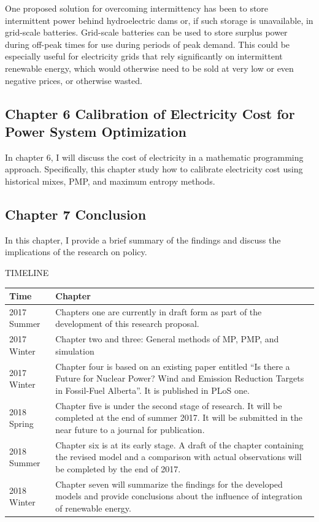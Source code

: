 \documentclass[10pt,letter]{article}
\begin{document}
One proposed solution for overcoming intermittency has been to store
intermittent power behind hydroelectric dams or, if such storage is
unavailable, in grid-scale batteries. Grid-scale batteries can be used
to store surplus power during off-peak times for use during periods of
peak demand. This could be especially useful for electricity grids that
rely significantly on intermittent renewable energy, which would
otherwise need to be sold at very low or even negative prices, or
otherwise wasted.

\subsection{Chapter 6 Calibration of Electricity Cost for Power System
Optimization
}\label{chapter-6-calibration-of-electricity-cost-for-power-system-optimization}

In chapter 6, I will discuss the cost of electricity in a mathematic
programming approach. Specifically, this chapter study how to calibrate
electricity cost using historical mixes, PMP, and maximum entropy
methods.

\subsection{Chapter 7 Conclusion }\label{chapter-7-conclusion}

In this chapter, I provide a brief summary of the findings and discuss
the implications of the research on policy.

TIMELINE

\begin{longtable}[]{@{}ll@{}}
\toprule
Time & Chapter\tabularnewline
\midrule
\endhead
2017 Summer & Chapters one are currently in draft form as part of the
development of this research proposal.\tabularnewline
2017 Winter & Chapter two and three: General methods of MP, PMP, and
simulation\tabularnewline
2017 Winter & Chapter four is based on an existing paper entitled ``Is
there a Future for Nuclear Power? Wind and Emission Reduction Targets in
Fossil-Fuel Alberta''. It is published in PLoS one.\tabularnewline
2018 Spring & Chapter five is under the second stage of research. It
will be completed at the end of summer 2017. It will be submitted in the
near future to a journal for publication.\tabularnewline
2018 Summer & Chapter six is at its early stage. A draft of the chapter
containing the revised model and a comparison with actual observations
will be completed by the end of 2017.\tabularnewline
2018 Winter & Chapter seven will summarize the findings for the
developed models and provide conclusions about the influence of
integration of renewable energy.\tabularnewline
\bottomrule

\end{longtable}
\end{document}
